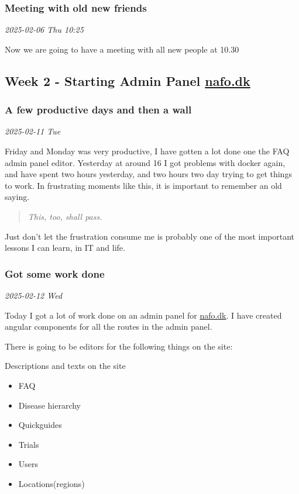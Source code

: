 \documentclass[../main.tex]{subfiles}
\begin{document}
\subsubsection{Meeting with old new friends}

\textit{2025-02-06 Thu 10:25}

Now we are going to have a meeting with all new people at 10.30 

\subsection{Week 2 - Starting Admin Panel \href{https://www.nationaltforsoegsoverblik.dk/}{nafo.dk}}
\subsubsection{A few productive days and then a wall}

\textit{2025-02-11 Tue}

Friday and Monday was very productive, I have gotten a lot done one the FAQ admin panel editor. Yesterday at around 16 I got problems with docker again, and have spent two hours yesterday, and two hours two day trying to get things to work. In frustrating moments like this, it is important to remember an old saying.

\begin{quote}
\emph{This, too, shall pass.}
\end{quote}

Just don't let the frustration consume me is probably one of the most important lessons I can learn, in IT and life.

\subsubsection{Got some work done}

\textit{2025-02-12 Wed}

Today I got a lot of work done on an admin panel for \href{https://www.nationaltforsoegsoverblik.dk/}{nafo.dk}. I have created angular components for all the routes in the admin panel.

There is going to be editors for the following things on the site:

Descriptions and texts on the site

\begin{itemize}
\item FAQ
\item Disease hierarchy
\item Quickguides
\item Trials
\item Users
\item Locations(regions)
\end{itemize}
\end{document}
